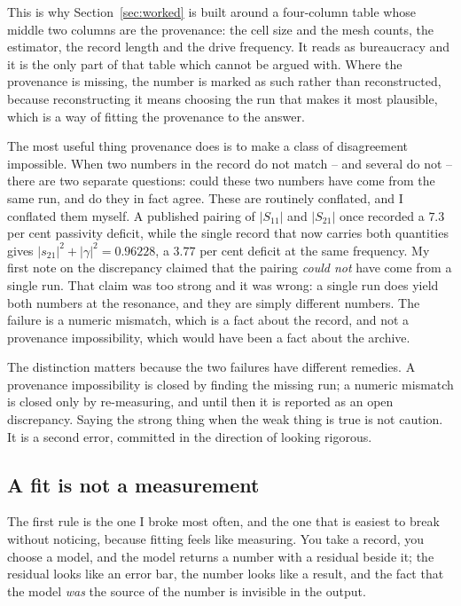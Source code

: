 This is why Section~\ref{sec:worked} is built around a four-column table whose middle two columns are the
provenance: the cell size and the mesh counts, the estimator, the record length and the drive frequency. It reads
as bureaucracy and it is the only part of that table which cannot be argued with. Where the provenance is
missing, the number is marked as such rather than reconstructed, because reconstructing it means choosing the
run that makes it most plausible, which is a way of fitting the provenance to the answer.

The most useful thing provenance does is to make a class of disagreement impossible. When two numbers in the
record do not match -- and several do not -- there are two separate questions: could these two numbers have come
from the same run, and do they in fact agree. These are routinely conflated, and I conflated them myself. A
published pairing of $|S_{11}|$ and $|S_{21}|$ once recorded a $7.3$ per cent passivity deficit, while the single
record that now carries both quantities gives $|s_{21}|^2 + |\gamma|^2 = 0.96228$, a $3.77$ per cent deficit at
the same frequency. My first note on the discrepancy claimed that the pairing \emph{could not} have come from a
single run. That claim was too strong and it was wrong: a single run does yield both numbers at the resonance,
and they are simply different numbers. The failure is a numeric mismatch, which is a fact about the record, and
not a provenance impossibility, which would have been a fact about the archive.

The distinction matters because the two failures have different remedies. A provenance impossibility is closed
by finding the missing run; a numeric mismatch is closed only by re-measuring, and until then it is reported as
an open discrepancy. Saying the strong thing when the weak thing is true is not caution. It is a second error,
committed in the direction of looking rigorous.

\subsection{A fit is not a measurement}
\label{sec:method-fit}

The first rule is the one I broke most often, and the one that is easiest to break without noticing, because
fitting feels like measuring. You take a record, you choose a model, and the model returns a number with a
residual beside it; the residual looks like an error bar, the number looks like a result, and the fact that the
model \emph{was} the source of the number is invisible in the output.

